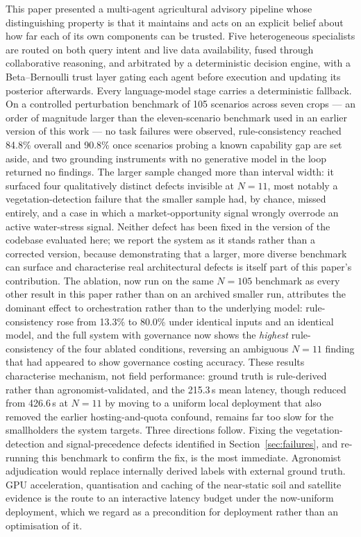 \documentclass[preprint,12pt]{elsarticle}
\begin{document}
This paper presented a multi-agent agricultural advisory pipeline whose
distinguishing property is that it maintains and acts on an explicit belief
about how far each of its own components can be trusted. Five heterogeneous
specialists are routed on both query intent and live data availability,
fused through collaborative reasoning, and arbitrated by a deterministic
decision engine, with a Beta--Bernoulli trust layer gating each agent before
execution and updating its posterior afterwards. Every language-model stage
carries a deterministic fallback. On a controlled perturbation benchmark of
105 scenarios across seven crops --- an order of magnitude larger than the
eleven-scenario benchmark used in an earlier version of this work --- no
task failures were observed, rule-consistency reached 84.8\% overall and
90.8\% once scenarios probing a known capability gap are set aside, and two
grounding instruments with no generative model in the loop returned no
findings. The larger sample changed more than interval width: it surfaced
four qualitatively distinct defects invisible at $N=11$, most notably a
vegetation-detection failure that the smaller sample had, by chance, missed
entirely, and a case in which a market-opportunity signal wrongly overrode
an active water-stress signal. Neither defect has been fixed in the version
of the codebase evaluated here; we report the system as it stands rather
than a corrected version, because demonstrating that a larger, more
diverse benchmark can surface and characterise real architectural defects
is itself part of this paper's contribution.
The ablation, now run on the same $N=105$ benchmark as every other result
in this paper rather than on an archived smaller run, attributes the
dominant effect to orchestration rather than to the underlying model:
rule-consistency rose from 13.3\% to 80.0\% under identical inputs and an
identical model, and the full system with governance now shows the
\emph{highest} rule-consistency of the four ablated conditions, reversing
an ambiguous $N=11$ finding that had appeared to show governance costing
accuracy. These results characterise
mechanism, not field performance: ground truth is
rule-derived rather than agronomist-validated, and the 215.3\,s mean
latency, though reduced from 426.6\,s at $N=11$ by moving to a uniform
local deployment that also removed the earlier hosting-and-quota confound,
remains far too slow for the smallholders the system targets. Three
directions follow. Fixing the vegetation-detection and
signal-precedence defects identified in Section~\ref{sec:failures}, and
re-running this benchmark to confirm the fix, is the most immediate.
Agronomist adjudication would replace internally derived labels with
external ground truth. GPU acceleration, quantisation and caching of the
near-static soil and satellite evidence is the route to an interactive
latency budget under the now-uniform deployment, which we regard as a
precondition for deployment rather than an optimisation of it.
\end{document}
